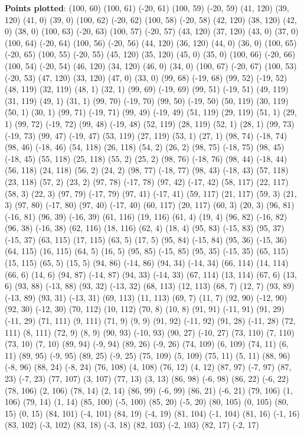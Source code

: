 \documentclass[12pt,letterpaper]{article}
\begin{document}
\textbf{Points plotted}: 
(100, 60) (100, 61) (-20, 61) (100, 59) 
(-20, 59) (41, 120) (39, 120) (41, 0) 
(39, 0) (100, 62) (-20, 62) (100, 58) 
(-20, 58) (42, 120) (38, 120) (42, 0) 
(38, 0) (100, 63) (-20, 63) (100, 57) 
(-20, 57) (43, 120) (37, 120) (43, 0) 
(37, 0) (100, 64) (-20, 64) (100, 56) 
(-20, 56) (44, 120) (36, 120) (44, 0) 
(36, 0) (100, 65) (-20, 65) (100, 55) 
(-20, 55) (45, 120) (35, 120) (45, 0) 
(35, 0) (100, 66) (-20, 66) (100, 54) 
(-20, 54) (46, 120) (34, 120) (46, 0) 
(34, 0) (100, 67) (-20, 67) (100, 53) 
(-20, 53) (47, 120) (33, 120) (47, 0) 
(33, 0) (99, 68) (-19, 68) (99, 52) 
(-19, 52) (48, 119) (32, 119) (48, 1) 
(32, 1) (99, 69) (-19, 69) (99, 51) 
(-19, 51) (49, 119) (31, 119) (49, 1) 
(31, 1) (99, 70) (-19, 70) (99, 50) 
(-19, 50) (50, 119) (30, 119) (50, 1) 
(30, 1) (99, 71) (-19, 71) (99, 49) 
(-19, 49) (51, 119) (29, 119) (51, 1) 
(29, 1) (99, 72) (-19, 72) (99, 48) 
(-19, 48) (52, 119) (28, 119) (52, 1) 
(28, 1) (99, 73) (-19, 73) (99, 47) 
(-19, 47) (53, 119) (27, 119) (53, 1) 
(27, 1) (98, 74) (-18, 74) (98, 46) 
(-18, 46) (54, 118) (26, 118) (54, 2) 
(26, 2) (98, 75) (-18, 75) (98, 45) 
(-18, 45) (55, 118) (25, 118) (55, 2) 
(25, 2) (98, 76) (-18, 76) (98, 44) 
(-18, 44) (56, 118) (24, 118) (56, 2) 
(24, 2) (98, 77) (-18, 77) (98, 43) 
(-18, 43) (57, 118) (23, 118) (57, 2) 
(23, 2) (97, 78) (-17, 78) (97, 42) 
(-17, 42) (58, 117) (22, 117) (58, 3) 
(22, 3) (97, 79) (-17, 79) (97, 41) 
(-17, 41) (59, 117) (21, 117) (59, 3) 
(21, 3) (97, 80) (-17, 80) (97, 40) 
(-17, 40) (60, 117) (20, 117) (60, 3) 
(20, 3) (96, 81) (-16, 81) (96, 39) 
(-16, 39) (61, 116) (19, 116) (61, 4) 
(19, 4) (96, 82) (-16, 82) (96, 38) 
(-16, 38) (62, 116) (18, 116) (62, 4) 
(18, 4) (95, 83) (-15, 83) (95, 37) 
(-15, 37) (63, 115) (17, 115) (63, 5) 
(17, 5) (95, 84) (-15, 84) (95, 36) 
(-15, 36) (64, 115) (16, 115) (64, 5) 
(16, 5) (95, 85) (-15, 85) (95, 35) 
(-15, 35) (65, 115) (15, 115) (65, 5) 
(15, 5) (94, 86) (-14, 86) (94, 34) 
(-14, 34) (66, 114) (14, 114) (66, 6) 
(14, 6) (94, 87) (-14, 87) (94, 33) 
(-14, 33) (67, 114) (13, 114) (67, 6) 
(13, 6) (93, 88) (-13, 88) (93, 32) 
(-13, 32) (68, 113) (12, 113) (68, 7) 
(12, 7) (93, 89) (-13, 89) (93, 31) 
(-13, 31) (69, 113) (11, 113) (69, 7) 
(11, 7) (92, 90) (-12, 90) (92, 30) 
(-12, 30) (70, 112) (10, 112) (70, 8) 
(10, 8) (91, 91) (-11, 91) (91, 29) 
(-11, 29) (71, 111) (9, 111) (71, 9) 
(9, 9) (91, 92) (-11, 92) (91, 28) 
(-11, 28) (72, 111) (8, 111) (72, 9) 
(8, 9) (90, 93) (-10, 93) (90, 27) 
(-10, 27) (73, 110) (7, 110) (73, 10) 
(7, 10) (89, 94) (-9, 94) (89, 26) 
(-9, 26) (74, 109) (6, 109) (74, 11) 
(6, 11) (89, 95) (-9, 95) (89, 25) 
(-9, 25) (75, 109) (5, 109) (75, 11) 
(5, 11) (88, 96) (-8, 96) (88, 24) 
(-8, 24) (76, 108) (4, 108) (76, 12) 
(4, 12) (87, 97) (-7, 97) (87, 23) 
(-7, 23) (77, 107) (3, 107) (77, 13) 
(3, 13) (86, 98) (-6, 98) (86, 22) 
(-6, 22) (78, 106) (2, 106) (78, 14) 
(2, 14) (86, 99) (-6, 99) (86, 21) 
(-6, 21) (79, 106) (1, 106) (79, 14) 
(1, 14) (85, 100) (-5, 100) (85, 20) 
(-5, 20) (80, 105) (0, 105) (80, 15) 
(0, 15) (84, 101) (-4, 101) (84, 19) 
(-4, 19) (81, 104) (-1, 104) (81, 16) 
(-1, 16) (83, 102) (-3, 102) (83, 18) 
(-3, 18) (82, 103) (-2, 103) (82, 17) 
(-2, 17)
\end{document}
